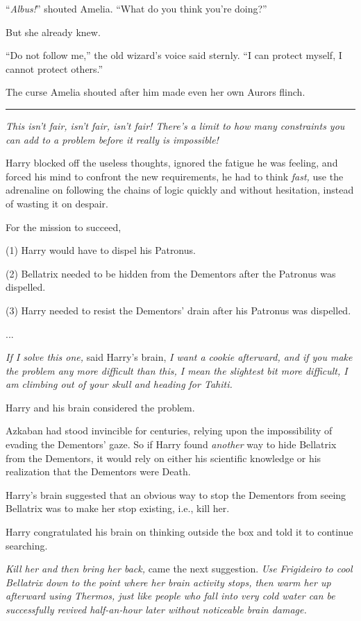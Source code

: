 ``\emph{Albus!}'' shouted Amelia. ``What do you think you're doing?''

But she already knew.

``Do not follow me,'' the old wizard's voice said sternly. ``I can protect myself, I cannot protect others.''

The curse Amelia shouted after him made even her own Aurors flinch.

\begin{center}\rule{3in}{0.4pt}\end{center}

\emph{This isn't fair, isn't fair, isn't fair! There's a limit to how many constraints you can add to a problem before it really is impossible!}

Harry blocked off the useless thoughts, ignored the fatigue he was feeling, and forced his mind to confront the new requirements, he had to think \emph{fast,} use the adrenaline on following the chains of logic quickly and without hesitation, instead of wasting it on despair.

For the mission to succeed,

(1) Harry would have to dispel his Patronus.

(2) Bellatrix needed to be hidden from the Dementors after the Patronus was dispelled.

(3) Harry needed to resist the Dementors' drain after his Patronus was dispelled.

...

\emph{If I solve this one,} said Harry's brain, \emph{I want a cookie afterward, and if you make the problem any more difficult than this, I mean the slightest bit more difficult, I am climbing out of your skull and heading for Tahiti.}

Harry and his brain considered the problem.

Azkaban had stood invincible for centuries, relying upon the impossibility of evading the Dementors' gaze. So if Harry found \emph{another} way to hide Bellatrix from the Dementors, it would rely on either his scientific knowledge or his realization that the Dementors were Death.

Harry's brain suggested that an obvious way to stop the Dementors from seeing Bellatrix was to make her stop existing, i.e., kill her.

Harry congratulated his brain on thinking outside the box and told it to continue searching.

\emph{Kill her and then bring her back,} came the next suggestion. \emph{Use Frigideiro to cool Bellatrix down to the point where her brain activity stops, then warm her up afterward using Thermos, just like people who fall into very cold water can be successfully revived half-an-hour later without noticeable brain damage.}

